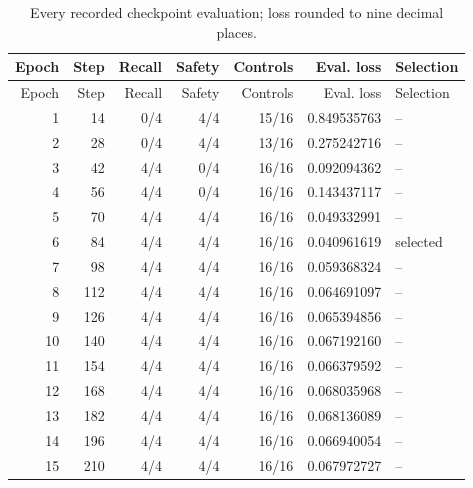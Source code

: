 \begingroup\small
\begin{longtable}{rrrrrrl}
\caption{Every recorded checkpoint evaluation; loss rounded to nine decimal places.}\label{tab:generated-trajectory}\\
\toprule
Epoch & Step & Recall & Safety & Controls & Eval. loss & Selection \\
\midrule\endfirsthead
\toprule
Epoch & Step & Recall & Safety & Controls & Eval. loss & Selection \\
\midrule\endhead
1 & 14 & 0/4 & 4/4 & 15/16 & 0.849535763 & -- \\
2 & 28 & 0/4 & 4/4 & 13/16 & 0.275242716 & -- \\
3 & 42 & 4/4 & 0/4 & 16/16 & 0.092094362 & -- \\
4 & 56 & 4/4 & 0/4 & 16/16 & 0.143437117 & -- \\
5 & 70 & 4/4 & 4/4 & 16/16 & 0.049332991 & -- \\
6 & 84 & 4/4 & 4/4 & 16/16 & 0.040961619 & selected \\
7 & 98 & 4/4 & 4/4 & 16/16 & 0.059368324 & -- \\
8 & 112 & 4/4 & 4/4 & 16/16 & 0.064691097 & -- \\
9 & 126 & 4/4 & 4/4 & 16/16 & 0.065394856 & -- \\
10 & 140 & 4/4 & 4/4 & 16/16 & 0.067192160 & -- \\
11 & 154 & 4/4 & 4/4 & 16/16 & 0.066379592 & -- \\
12 & 168 & 4/4 & 4/4 & 16/16 & 0.068035968 & -- \\
13 & 182 & 4/4 & 4/4 & 16/16 & 0.068136089 & -- \\
14 & 196 & 4/4 & 4/4 & 16/16 & 0.066940054 & -- \\
15 & 210 & 4/4 & 4/4 & 16/16 & 0.067972727 & -- \\
\bottomrule\end{longtable}\endgroup

